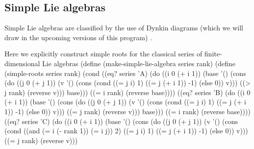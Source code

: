 \documentclass[a4paper,10pt]{article}%
\theoremstyle{definition} \newtheorem{Def}{Definition}
\begin{document}
\subsection{Simple Lie algebras}
\label{sec:simple-lie-algebras}

Simple Lie algebras are classified by the use of Dynkin diagrams (which we will draw in the upcoming versions of this program) \cite{carter2005lie}.

Here we explicitly construct simple roots for the classical series of finite-dimensional Lie algebras
\nwenddocs{}\endmoddef\nwstartdeflinemarkup{}\nwenddeflinemarkup
(define (make-simple-lie-algebra series rank)
  (define (simple-roots series rank)
    (cond ((eq? series 'A)
           (do ((i 0 (+ i 1))
                (base '()
                      (cons 
                       (do ((j 0 (+ j 1))
                            (v '()
                               (cons
                                (cond ((= j i) 1)
                                      ((= j (+ i 1)) -1)
                                      (else 0))
                                v)))
                           ((> j rank) (reverse v)))
                       base)))
               ((= i rank) (reverse base))))
          ((eq? series 'B)
           (do ((i 0 (+ i 1))
                (base '()
                      (cons 
                       (do ((j 0 (+ j 1))
                            (v '()
                               (cons
                                (cond ((= j i) 1)
                                      ((= j (+ i 1)) -1)
                                      (else 0))
                                v)))
                           ((= j rank) (reverse v)))
                       base)))
               ((= i rank) (reverse base))))
          ((eq? series 'C)
           (do ((i 0 (+ i 1))
                (base '()
                      (cons 
                       (do ((j 0 (+ j 1))
                            (v '()
                               (cons
                                (cond ((and (= i (- rank 1)) (= i j)) 2)
                                      ((= j i) 1)
                                      ((= j (+ i 1)) -1)
                                      (else 0))
                                v)))
                           ((= j rank) (reverse v)))
\end{document}
